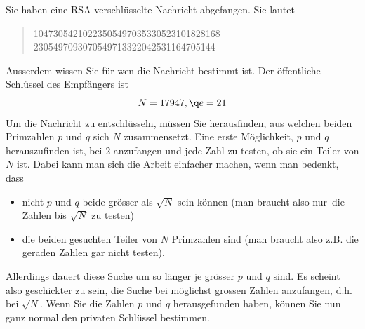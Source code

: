 \documentclass[%
11pt,%
twoside,%
titlepage,%
german,%
headsepline%
]{scrartcl}
\begin{document}
\begin{bsp}
Sie haben eine RSA-verschlüsselte Nachricht abgefangen. Sie lautet
\begin{quote}
10473054210223505497035330523101828168\\
2305497093070549713322042531164705144
\end{quote}
Ausserdem wissen Sie für wen die Nachricht bestimmt ist. Der \"offentliche Schlüssel des Empfängers ist
$$N=17947,\q e=21$$
Um die Nachricht zu entschlüsseln, müssen Sie herausfinden, aus welchen beiden Primzahlen $p$ und $q$ sich $N$ zusammensetzt.
Eine erste Möglichkeit, $p$ und $q$ herauszufinden ist, bei 2 anzufangen und jede Zahl zu testen, ob sie ein Teiler von $N$ ist. Dabei kann man sich die Arbeit einfacher machen, wenn man bedenkt, dass
\begin{itemize}
\item nicht $p$ und $q$ beide gr\"osser als $\sqrt{N}$ sein k\"onnen (man braucht also \glqq nur\grqq\ die Zahlen bis $\sqrt{N}$ zu testen)
\item die beiden gesuchten Teiler von $N$ Primzahlen sind (man braucht also z.B. die geraden Zahlen gar nicht testen).
\end{itemize}
Allerdings dauert diese Suche um so länger je grösser $p$ und $q$  sind. Es scheint also geschickter zu sein, die Suche bei möglichst grossen Zahlen anzufangen, d.h. bei $\sqrt{N}$.
Wenn Sie die Zahlen $p$ und $q$ herausgefunden haben, k\"onnen Sie nun ganz normal den privaten Schlüssel  bestimmen.
\end{bsp}
\end{document}
